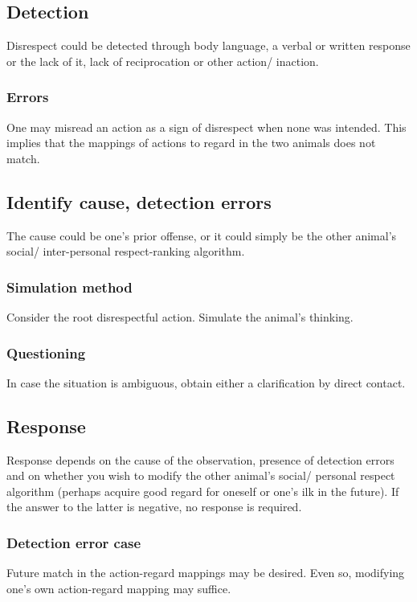 \documentclass[oneside, article]{memoir}
\begin{document}
\subsection{Detection}
Disrespect could be detected through body language, a verbal or written response or the lack of it, lack of reciprocation or other action/ inaction.

\subsubsection{Errors}
One may misread an action as a sign of disrespect when none was intended. This implies that the mappings of actions to regard in the two animals does not match.

\subsection{Identify cause, detection errors}
The cause could be one's prior offense, or it could simply be the other animal's social/ inter-personal respect-ranking algorithm.

\subsubsection{Simulation method}
Consider the root disrespectful action. Simulate the animal's thinking.

\subsubsection{Questioning}
In case the situation is ambiguous, obtain either a clarification by direct contact.

\subsection{Response}
Response depends on the cause of the observation, presence of detection errors and on whether you wish to modify the other animal's social/ personal respect algorithm (perhaps acquire good regard for oneself or one's ilk in the future). If the answer to the latter is negative, no response is required. 

\subsubsection{Detection error case}
Future match in the action-regard mappings may be desired. Even so, modifying one's own action-regard mapping may suffice.
\end{document}
